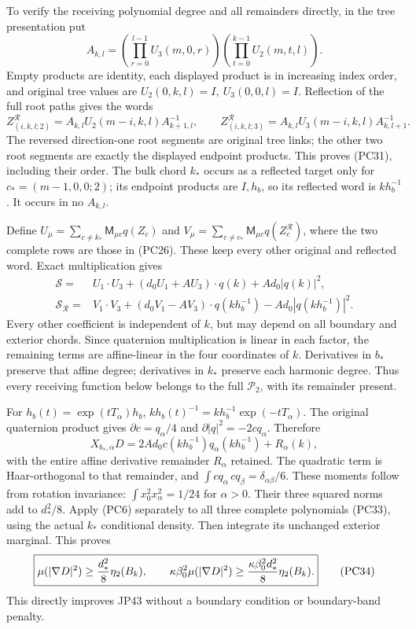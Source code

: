 \documentclass[11pt]{article}
\begin{document}
To verify the receiving polynomial degree and all remainders directly,
in the tree presentation put
\[
 A_{k,l}=\left(\prod_{r=0}^{l-1}U_3(m,0,r)\right)
                   \left(\prod_{t=0}^{k-1}U_2(m,t,l)\right).
\]
Empty products are identity, each displayed product is in increasing
index order, and original tree values are
\(U_2(0,k,l)=I,\ U_3(0,0,l)=I\).
Reflection of the full root paths gives the words
\[
 Z^{\mathcal R}_{(i,k,l;2)}
       =A_{k,l}U_2(m-i,k,l)A_{k+1,l}^{-1},\qquad
 Z^{\mathcal R}_{(i,k,l;3)}
       =A_{k,l}U_3(m-i,k,l)A_{k,l+1}^{-1}.
 \tag{PC31}
\]
The reversed direction-one root segments are original tree links;
the other two root segments are exactly the displayed endpoint
products. This proves (PC31), including their order.
The bulk chord \(k_*\) occurs as a reflected target only for
\(c_*=(m-1,0,0;2)\); its endpoint products are \(I,h_b\), so
its reflected word is \(kh_b^{-1}\). It occurs in no \(A_{k,l}\).

Define \(U_\mu=\sum_{c\ne k_*}\mathsf M_{\mu c}q(Z_c)\) and
\(V_\mu=\sum_{c\ne c_*}\mathsf M_{\mu c}q(Z_c^{\mathcal R})\),
where the two complete rows are those in (PC26). These keep every
other original and reflected word. Exact multiplication gives
\[
 \begin{aligned}
 \mathcal S={}&U_1\cdot U_3+(d_0U_1+AU_3)\cdot q(k)
                                         +Ad_0|q(k)|^2,\\
 \mathcal S_{\mathcal R}={}&V_1\cdot V_3
       +(d_0V_1-AV_3)\cdot q(kh_b^{-1})
                                 -Ad_0|q(kh_b^{-1})|^2.
 \end{aligned}\tag{PC32}
\]
Every other coefficient is independent of \(k\), but may depend on
all boundary and exterior chords. Since quaternion multiplication is
linear in each factor, the remaining terms are affine-linear in
the four coordinates of \(k\). Derivatives in \(b_*\) preserve that
affine degree; derivatives in \(k_*\) preserve each harmonic degree.
Thus every receiving function below belongs to the full
\(\mathcal P_2\), with its remainder present.

For \(h_b(t)=\exp(tT_\alpha)h_b\),
\(kh_b(t)^{-1}=kh_b^{-1}\exp(-tT_\alpha)\).
The original quaternion product gives
\(\partial c=q_\alpha/4\) and
\(\partial |q|^2=-2cq_\alpha\). Therefore
\[
 X_{b_*,\alpha}D
 =2Ad_0c(kh_b^{-1})q_\alpha(kh_b^{-1})+R_\alpha(k),
 \tag{PC33}
\]
with the entire affine derivative remainder \(R_\alpha\) retained.
The quadratic term is Haar-orthogonal to that remainder, and
\(\int c q_\alpha\,c q_\beta=\delta_{\alpha\beta}/6\).
These moments follow from rotation invariance:
\(\int x_0^2x_\alpha^2=1/24\) for \(\alpha>0\).
Their three squared norms add to \(d_*^2/8\).
Apply (PC6) separately to all three complete polynomials (PC33),
using the actual \(k_*\) conditional density. Then integrate its
unchanged exterior marginal. This proves
\[
 \boxed{\displaystyle
 \mu(|\nabla D|^2)\ge{d_*^2\over8}\eta_2(B_k),\qquad
 \kappa\beta_0^2\mu(|\nabla D|^2)
                \ge{\kappa\beta_0^2d_*^2\over8}\eta_2(B_k).}
 \tag{PC34}
\]
This directly improves JP43 without a boundary condition or
boundary-band penalty.
\end{document}
